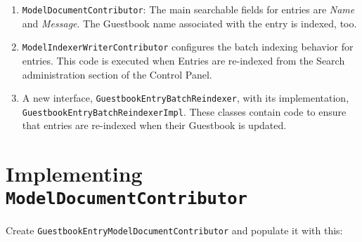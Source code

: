 \begin{enumerate}
\def\labelenumi{\arabic{enumi}.}
\item
  \texttt{ModelDocumentContributor}: The main searchable fields for
  entries are \emph{Name} and \emph{Message}. The Guestbook name
  associated with the entry is indexed, too.
\item
  \texttt{ModelIndexerWriterContributor} configures the batch indexing
  behavior for entries. This code is executed when Entries are
  re-indexed from the Search administration section of the Control
  Panel.
\item
  A new interface, \texttt{GuestbookEntryBatchReindexer}, with its
  implementation, \texttt{GuestbookEntryBatchReindexerImpl}. These
  classes contain code to ensure that entries are re-indexed when their
  Guestbook is updated.
\end{enumerate}

\section{\texorpdfstring{Implementing
\texttt{ModelDocumentContributor}}{Implementing ModelDocumentContributor}}\label{implementing-modeldocumentcontributor-1}

Create \texttt{GuestbookEntryModelDocumentContributor} and populate it
with this:

